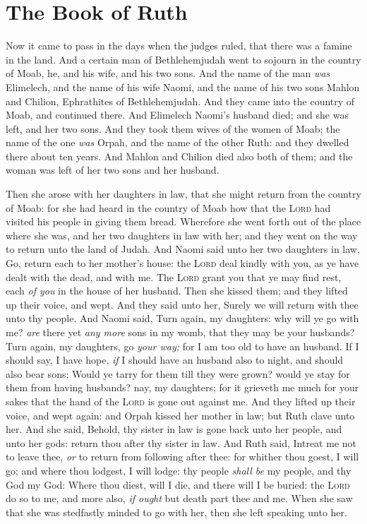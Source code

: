 \documentclass[11pt,letterpaper,oneside]{memoir}
\begin{document}
\chapter[Ruth]{The Book of Ruth}
Now it came to pass in the days when the judges ruled, that there was a 
famine in the land. And a certain man of Bethlehemjudah went to sojourn 
in the country of Moab, he, and his wife, and his two sons. And the name 
of the man \emph{was} Elimelech, and the name of his wife Naomi, and the 
name of his two sons Mahlon and Chilion, Ephrathites of Bethlehemjudah. 
And they came into the country of Moab, and continued there. And 
Elimelech Naomi's husband died; and she was left, and her two sons. And 
they took them wives of the women of Moab; the name of the one 
\emph{was} Orpah, and the name of the other Ruth: and they dwelled there 
about ten years. And Mahlon and Chilion died also both of them; and the 
woman was left of her two sons and her husband. 

Then she arose with her daughters in law, that she might return from the 
country of Moab: for she had heard in the country of Moab how that the 
\textsc{Lord} had visited his people in giving them bread. Wherefore she 
went forth out of the place where she was, and her two daughters in law 
with her; and they went on the way to return unto the land of Judah. And 
Naomi said unto her two daughters in law, Go, return each to her 
mother's house: the \textsc{Lord} deal kindly with you, as ye have dealt 
with the dead, and with me. The \textsc{Lord} grant you that ye may find 
rest, each \emph{of you} in the house of her husband. Then she kissed 
them; and they lifted up their voice, and wept. And they said unto her, 
Surely we will return with thee unto thy people. And Naomi said, Turn 
again, my daughters: why will ye go with me? \emph{are} there yet 
\emph{any more} sons in my womb, that they may be your husbands? Turn 
again, my daughters, go \emph{your way;} for I am too old to have an 
husband. If I should say, I have hope, \emph{if} I should have an 
husband also to night, and should also bear sons; Would ye tarry for 
them till they were grown? would ye stay for them from having husbands? 
nay, my daughters; for it grieveth me much for your sakes that the hand 
of the \textsc{Lord} is gone out against me. And they lifted up their 
voice, and wept again: and Orpah kissed her mother in law; but Ruth 
clave unto her. And she said, Behold, thy sister in law is gone back 
unto her people, and unto her gods: return thou after thy sister in law. 
And Ruth said, Intreat me not to leave thee, \emph{or} to return from 
following after thee: for whither thou goest, I will go; and where thou 
lodgest, I will lodge: thy people \emph{shall be} my people, and thy God 
my God: Where thou diest, will I die, and there will I be buried: the 
\textsc{Lord} do so to me, and more also, \emph{if ought} but death part 
thee and me. When she saw that she was stedfastly minded to go with her, 
then she left speaking unto her. 
\end{document}
